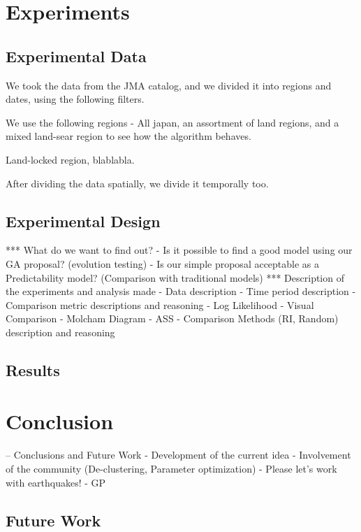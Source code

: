 \documentclass{sig-alternate}
\begin{document}
\section{Experiments}

\subsection{Experimental Data}

We took the data from the JMA catalog, and we divided it into regions
and dates, using the following filters.

We use the following regions - All japan, an assortment of land
regions, and a mixed land-sear region to see how the algorithm
behaves.

Land-locked region, blablabla.

After dividing the data spatially, we divide it temporally too.


\subsection{Experimental Design}

*** What do we want to find out?
    - Is it possible to find a good model using our GA proposal?
      (evolution testing)
    - Is our simple proposal acceptable as a Predictability model?
      (Comparison with traditional models)
*** Description of the experiments and analysis made
    - Data description
    - Time period description
    - Comparison metric descriptions and reasoning
      - Log Likelihood
      - Visual Comparison
      - Molcham Diagram
      - ASS
    - Comparison Methods (RI, Random) description and reasoning

\subsection{Results}

\section{Conclusion}
-- Conclusions and Future Work
   - Development of the current idea
   - Involvement of the community (De-clustering, Parameter optimization)
   - Please let's work with earthquakes!
   - GP
\subsection{Future Work}





\end{document}
